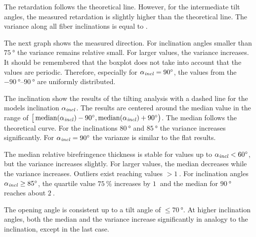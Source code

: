The retardation follows the theoretical line.
However, for the intermediate tilt angles, the measured retardation is slightly higher than the theoretical line.
The variance along all fiber inclinations is equal to \modelInc{}.
\par
%
The next graph shows the measured direction.
For inclination angles smaller than $\SI{75}{\degree}$ the variance remains relative small.
For larger values, the variance increases.
It should be remembered that the boxplot does not take into account that the values are periodic.
Therefore, especially for $\textnormal{$\alpha_{\mathit{incl}}$}=\SI{90}{\degree}$, the values from the $\SIrange{-90}{90}{\degree}$ are uniformly distributed.
\par
%
The inclination show the results of the tilting analysis with a dashed line for the models inclination $\textnormal{$\alpha_{\mathit{incl}}$}$.
The results are centered around the median value in the range of $\big[\operatorname{median} (\textnormal{$\alpha_{\mathit{incl}}$})-\SI{90}{\degree}, \operatorname{median}(\textnormal{$\alpha_{\mathit{incl}}$})+\SI{90}{\degree}\big)$.
The median follows the theoretical curve.
For the inclinations $\SI{80}{\degree}$ and $\SI{85}{\degree}$ the variance increases significantly.
For $\textnormal{$\alpha_{\mathit{incl}}$} = \SI{90}{\degree}$ the varianze is similar to the flat results.
\par
%
The median relative birefringence thickness \trel{} is stable for values up to $\textnormal{$\alpha_{\mathit{incl}}$} < \SI{60}{\degree}$, but the variance increases slightly.
For larger values, the median decreases while the variance increases.
Outliers exist reaching values $>\SI{1}{}$.
For inclination angles $\textnormal{$\alpha_{\mathit{incl}}$} \ge \SI{85}{\degree}$, the quartile value $\SI{75}{\percent}$ increases by $\SI{1}{}$ and the median for $\SI{90}{\degree}$ reaches about $\SI{2}{}$.
\par
%
The opening angle \openingAngle{} is consistent up to a tilt angle of $\le \SI{70}{\degree}$.
At higher inclination angles, both the median and the variance increase significantly in analogy to the inclination, except in the last case.
%
%
%
